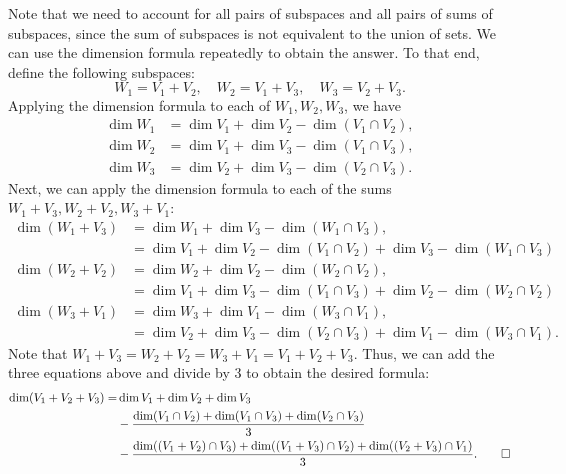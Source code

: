 \begin{sol}
    Note that we need to account for all pairs of subspaces and all pairs of sums of subspaces, since the sum of subspaces is not equivalent to the union of sets.
	We can use the dimension formula repeatedly to obtain the answer.
	To that end, define the following subspaces:
    \[
    	W_1 = V_1 + V_2, \quad W_2 = V_1 + V_3, \quad W_3 = V_2 + V_3.
    \]
    Applying the dimension formula to each of $W_1, W_2, W_3$, we have
    \begin{align*}
        \dim W_1 & = \dim V_1 + \dim V_2 - \dim(V_1 \cap V_2), \\
        \dim W_2 & = \dim V_1 + \dim V_3 - \dim(V_1 \cap V_3), \\
        \dim W_3 & = \dim V_2 + \dim V_3 - \dim(V_2 \cap V_3).
    \end{align*}
    Next, we can apply the dimension formula to each of the sums $W_1 + V_3, W_2 + V_2, W_3 + V_1$:
    \begin{align*}
        \dim(W_1 + V_3) & = \dim W_1 + \dim V_3 - \dim(W_1 \cap V_3), \\
        & = \dim V_1 + \dim V_2 - \dim(V_1 \cap V_2) + \dim V_3 - \dim(W_1 \cap V_3) \\
        \dim(W_2 + V_2) & = \dim W_2 + \dim V_2 - \dim(W_2 \cap V_2), \\
        & = \dim V_1 + \dim V_3 - \dim(V_1 \cap V_3) + \dim V_2 - \dim(W_2 \cap V_2) \\
        \dim(W_3 + V_1) & = \dim W_3 + \dim V_1 - \dim(W_3 \cap V_1), \\
        & = \dim V_2 + \dim V_3 - \dim(V_2 \cap V_3) + \dim V_1 - \dim(W_3 \cap V_1).
    \end{align*}
    Note that $W_1 + V_3 = W_2 + V_2 = W_3 + V_1 = V_1 + V_2 + V_3$.
	Thus, we can add the three equations above and divide by $3$ to obtain the desired formula:
    \begin{align*}
        \dim(V_1 + V_2 + V_3) = & \dim V_1 + \dim V_2 + \dim V_3 \\
        &- \frac{\dim(V_1 \cap V_2) + \dim(V_1 \cap V_3) + \dim(V_2 \cap V_3)}{3} \\
        &- \frac{\dim((V_1 + V_2) \cap V_3) + \dim((V_1 + V_3) \cap V_2) + \dim((V_2 + V_3) \cap V_1)}{3}. \qedhere
    \end{align*}
\end{sol}